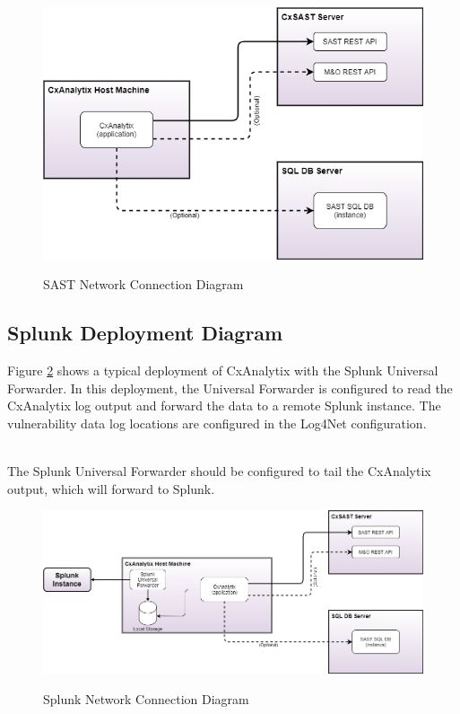 \begin{figure}[h]
    \caption{SAST Network Connection Diagram}
    \includegraphics[width=\textwidth]{graphics/Deployment-SAST-connections.png}
    \label{fig:SAST-network}
\end{figure}

\subsection{Splunk Deployment Diagram}
Figure \ref{fig:SPLUNK-network} shows a typical deployment of CxAnalytix with the Splunk Universal Forwarder. In this deployment,
the Universal Forwarder is configured to read the CxAnalytix log output and forward the data to a remote Splunk instance. The vulnerability 
data log locations are configured in the Log4Net configuration.

\noindent\\The Splunk Universal Forwarder should be configured to tail the CxAnalytix output, which will forward to Splunk.

\begin{figure}[h]
    \caption{Splunk Network Connection Diagram}
    \includegraphics[width=\textwidth]{graphics/Deployment-SPLUNK-connections.png}
    \label{fig:SPLUNK-network}
\end{figure}


